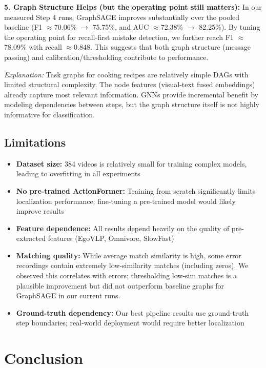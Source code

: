 \documentclass[10pt,twocolumn,letterpaper]{article}
\begin{document}
\textbf{5. Graph Structure Helps (but the operating point still matters):} In our measured Step 4 runs, GraphSAGE improves substantially over the pooled baseline (F1 $\approx$70.06\% $\rightarrow$ 75.75\%, and AUC $\approx$72.38\% $\rightarrow$ 82.25\%). By tuning the operating point for recall-first mistake detection, we further reach F1 $\approx$78.09\% with recall $\approx$0.848. This suggests that both graph structure (message passing) and calibration/thresholding contribute to performance.

\textit{Explanation:} Task graphs for cooking recipes are relatively simple DAGs with limited structural complexity. The node features (visual-text fused embeddings) already capture most relevant information. GNNs provide incremental benefit by modeling dependencies between steps, but the graph structure itself is not highly informative for classification.

\subsection{Limitations}

\begin{itemize}
    \item \textbf{Dataset size:} 384 videos is relatively small for training complex models, leading to overfitting in all experiments
    \item \textbf{No pre-trained ActionFormer:} Training from scratch significantly limits localization performance; fine-tuning a pre-trained model would likely improve results
    \item \textbf{Feature dependence:} All results depend heavily on the quality of pre-extracted features (EgoVLP, Omnivore, SlowFast)
    \item \textbf{Matching quality:} While average match similarity is high, some error recordings contain extremely low-similarity matches (including zeros). We observed this correlates with errors; thresholding low-sim matches is a plausible improvement but did not outperform baseline graphs for GraphSAGE in our current runs.
    \item \textbf{Ground-truth dependency:} Our best pipeline results use ground-truth step boundaries; real-world deployment would require better localization
\end{itemize}

\section{Conclusion}
\end{document}
